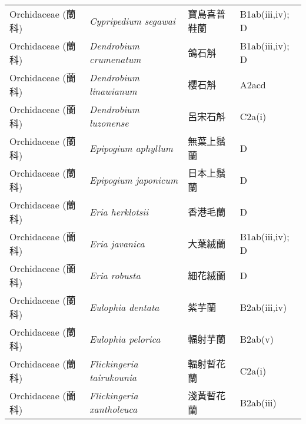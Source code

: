 \begin{longtable}{p{3cm}p{5cm}p{3cm}p{4cm}}
    Orchidaceae (蘭科) & \textit{Cypripedium segawai}  & 寶島喜普鞋蘭 & B1ab(iii,iv); D \index{Cypripedium@\textit{Cypripedium}!segawai@\textit{segawai}}  \index{寶島喜普鞋蘭} \\
    Orchidaceae (蘭科) & \textit{Dendrobium crumenatum}  & 鴿石斛 & B1ab(iii,iv); D \index{Dendrobium@\textit{Dendrobium}!crumenatum@\textit{crumenatum}}  \index{鴿石斛} \\
    Orchidaceae (蘭科) & \textit{Dendrobium linawianum}  & 櫻石斛 & A2acd \index{Dendrobium@\textit{Dendrobium}!linawianum@\textit{linawianum}}  \index{櫻石斛} \\
    Orchidaceae (蘭科) & \textit{Dendrobium luzonense}  & 呂宋石斛 & C2a(i) \index{Dendrobium@\textit{Dendrobium}!luzonense@\textit{luzonense}}  \index{呂宋石斛} \\
    Orchidaceae (蘭科) & \textit{Epipogium aphyllum}  & 無葉上鬚蘭 & D \index{Epipogium@\textit{Epipogium}!aphyllum@\textit{aphyllum}}  \index{無葉上鬚蘭} \\
    Orchidaceae (蘭科) & \textit{Epipogium japonicum}  & 日本上鬚蘭 & D \index{Epipogium@\textit{Epipogium}!japonicum@\textit{japonicum}}  \index{日本上鬚蘭} \\
    Orchidaceae (蘭科) & \textit{Eria herklotsii}  & 香港毛蘭 & D \index{Eria@\textit{Eria}!herklotsii@\textit{herklotsii}}  \index{香港毛蘭} \\
    Orchidaceae (蘭科) & \textit{Eria javanica}  & 大葉絨蘭 & B1ab(iii,iv); D \index{Eria@\textit{Eria}!javanica@\textit{javanica}}  \index{大葉絨蘭} \\
    Orchidaceae (蘭科) & \textit{Eria robusta}  & 細花絨蘭 & D \index{Eria@\textit{Eria}!robusta@\textit{robusta}}  \index{細花絨蘭} \\
    Orchidaceae (蘭科) & \textit{Eulophia dentata}  & 紫芋蘭 & B2ab(iii,iv) \index{Eulophia@\textit{Eulophia}!dentata@\textit{dentata}}  \index{紫芋蘭} \\
    Orchidaceae (蘭科) & \textit{Eulophia pelorica}  & 輻射芋蘭 & B2ab(v) \index{Eulophia@\textit{Eulophia}!pelorica@\textit{pelorica}}  \index{輻射芋蘭} \\
    Orchidaceae (蘭科) & \textit{Flickingeria tairukounia}  & 輻射暫花蘭 & C2a(i) \index{Flickingeria@\textit{Flickingeria}!tairukounia@\textit{tairukounia}}  \index{輻射暫花蘭} \\
    Orchidaceae (蘭科) & \textit{Flickingeria xantholeuca}  & 淺黃暫花蘭 & B2ab(iii) \index{Flickingeria@\textit{Flickingeria}!xantholeuca@\textit{xantholeuca}}  \index{淺黃暫花蘭} \\

\end{longtable}
